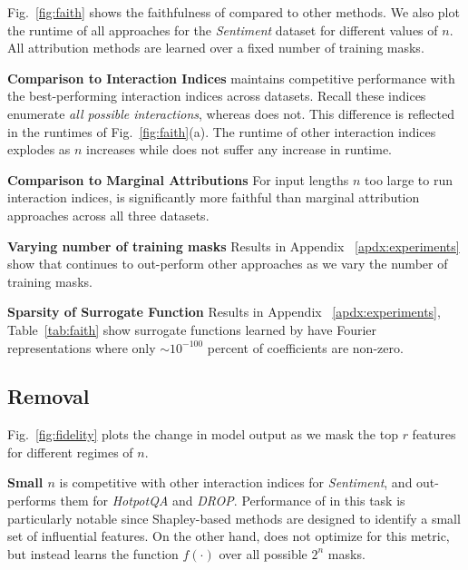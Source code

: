 Fig.~\ref{fig:faith} shows the faithfulness of \SpecExp{} compared to other methods. We also plot the runtime of all approaches for the \emph{Sentiment} dataset for different values of $n$. 
%
All attribution methods are learned over a fixed number of training masks.
% 

\textbf{Comparison to Interaction Indices } \SpecExp{} maintains competitive performance with the best-performing interaction indices across datasets. 
%
Recall these indices enumerate \emph{all possible interactions}, whereas \SpecExp{} does not. 
%
This difference is reflected in the runtimes of Fig.~\ref{fig:faith}(a).
%
The runtime of other interaction indices explodes as $n$ increases while \SpecExp{} does not suffer any increase in runtime. 

\vspace{-2pt}
\textbf{Comparison to Marginal Attributions } For input lengths $n$ too large to run interaction indices, \SpecExp{} is significantly more faithful than marginal attribution approaches across all three datasets.

\vspace{-2pt}
\textbf{Varying number of training masks } Results in Appendix ~\ref{apdx:experiments} show that \SpecExp{} continues to out-perform other approaches as we vary the number of training masks. 

\vspace{-2pt}
\textbf{Sparsity of \SpecExp{} Surrogate Function} Results in Appendix ~\ref{apdx:experiments}, Table~\ref{tab:faith} show 
surrogate functions learned by \SpecExp{} have Fourier representations where only $\sim 10^{-100}$ percent of coefficients are non-zero. 


\vspace{-6pt}
\subsection{Removal}
\label{subsec:removal}

Fig.~\ref{fig:fidelity} plots the change in model output as we mask the top $r$ features for different regimes of $n$. 
%

\vspace{-2pt}
\textbf{Small $n$ } \SpecExp{} is competitive with other interaction indices for \textit{Sentiment}, and out-performs them for \textit{HotpotQA} and \textit{DROP}. 
%
Performance of \SpecExp{} in this task is particularly notable since Shapley-based methods are designed to identify a small set of influential features. 
%
On the other hand, \SpecExp{} does not optimize for this metric, but instead learns the function $f(\cdot)$ over all possible $2^n$ masks. 
%

